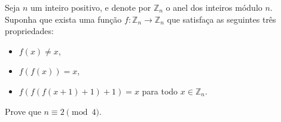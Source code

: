 Seja \(n\) um inteiro positivo, e denote por \(\mathbb{Z}_n\) o anel dos inteiros módulo \(n\). Suponha que exista uma função \(f\colon \mathbb{Z}_n\to\mathbb{Z}_n\) que satisfaça as seguintes três propriedades:
\begin{itemize}
\item[(i)] \(f(x)\neq x\),
\item[(ii)] \(f(f(x))=x\),
\item[(iii)] \(f(f(f(x+1)+1)+1)=x\) para todo \(x\in\mathbb{Z}_n\).
\end{itemize}
Prove que \(n\equiv 2 \pmod{4}\).
